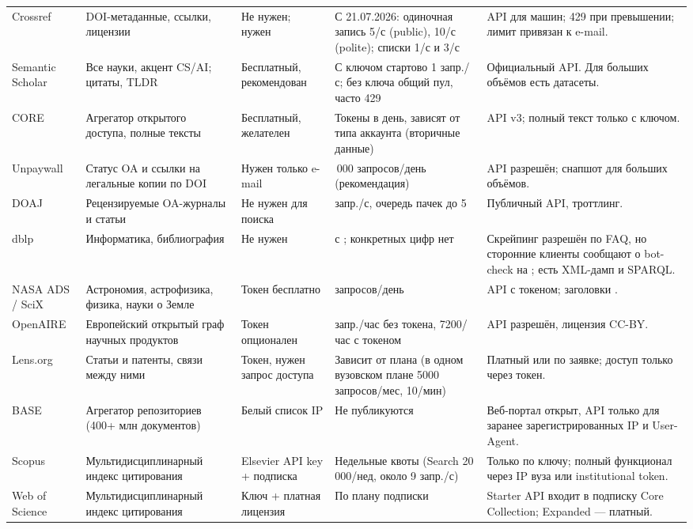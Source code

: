 \documentclass[11pt,a4paper]{article}
\newcommand{\code}[1]{\texttt{\detokenize{#1}}}
\begin{document}
\begin{landscape}
\begin{longtable}{>{\raggedright\arraybackslash}p{2.7cm}>{\raggedright\arraybackslash}p{3.4cm}>{\raggedright\arraybackslash}p{3.0cm}>{\raggedright\arraybackslash}p{6.2cm}>{\raggedright\arraybackslash}p{7.6cm}}
Crossref & DOI-метаданные, ссылки, лицензии & Не нужен; нужен \code{mailto} & С 21.07.2026: одиночная запись 5/с (public), 10/с (polite); списки 1/с и 3/с & API для машин; 429 при превышении; лимит привязан к e-mail.\\
Semantic Scholar & Все науки, акцент CS/AI; цитаты, TLDR & Бесплатный, рекомендован & С ключом стартово 1 запр./с; без ключа общий пул, часто 429 & Официальный API. Для больших объёмов есть датасеты.\\
CORE & Агрегатор открытого доступа, полные тексты & Бесплатный, желателен & Токены в день, зависят от типа аккаунта (вторичные данные) & API v3; полный текст только с ключом.\\
Unpaywall & Статус OA и ссылки на легальные копии по DOI & Нужен только e-mail & 100\,000 запросов/день (рекомендация) & API разрешён; снапшот для больших объёмов.\\
DOAJ & Рецензируемые OA-журналы и статьи & Не нужен для поиска & 2 запр./с, очередь пачек до 5 & Публичный API, троттлинг.\\
dblp & Информатика, библиография & Не нужен & 429 с \code{Retry-After}; конкретных цифр нет & Скрейпинг разрешён по FAQ, но сторонние клиенты сообщают о bot-check на \code{dblp.org}; есть XML-дамп и SPARQL.\\
NASA ADS / SciX & Астрономия, астрофизика, физика, науки о Земле & Токен бесплатно & 5000 запросов/день & API с токеном; заголовки \code{X-RateLimit-*}.\\
OpenAIRE & Европейский открытый граф научных продуктов & Токен опционален & 60 запр./час без токена, 7200/час с токеном & API разрешён, лицензия CC-BY.\\
Lens.org & Статьи и патенты, связи между ними & Токен, нужен запрос доступа & Зависит от плана (в одном вузовском плане 5000 запросов/мес, 10/мин) & Платный или по заявке; доступ только через токен.\\
BASE & Агрегатор репозиториев (400+ млн документов) & Белый список IP & Не публикуются & Веб-портал открыт, API только для заранее зарегистрированных IP и User-Agent.\\
Scopus & Мульти\-дисци\-плинар\-ный индекс цитирования & Elsevier API key + подписка & Недельные квоты (Search 20\,000/нед, около 9 запр./с) & Только по ключу; полный функционал через IP вуза или institutional token.\\
Web of Science & Мульти\-дисци\-плинар\-ный индекс цитирования & Ключ + платная лицензия & По плану подписки & Starter API входит в подписку Core Collection; Expanded --- платный.\\

\end{longtable}
\end{landscape}
\end{document}
